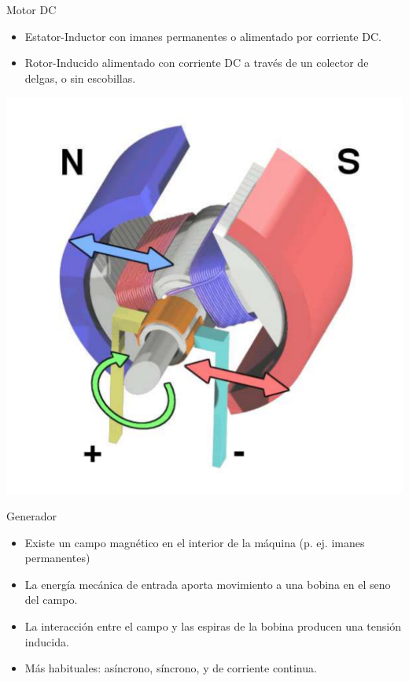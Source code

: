 \documentclass[xcolor={usenames,svgnames,dvipsnames}]{beamer}
\begin{document}
\begin{frame}[label={sec:org9376822}]{Motor DC}
\begin{itemize}
\item Estator-Inductor con imanes permanentes o alimentado por corriente DC.

\item Rotor-Inducido alimentado con corriente DC a través de un colector de delgas, o sin escobillas.
\end{itemize}

\begin{center}
\includegraphics[height=0.6\textheight]{../figs/Electric_motor_cycle_3.pdf}
\end{center}
\end{frame}


\begin{frame}[label={sec:org0b4752c}]{Generador}
\begin{itemize}
\item Existe un campo magnético en el interior de la máquina (p. ej. imanes permanentes)
\item La energía mecánica de entrada aporta movimiento a una bobina en el seno del campo.
\item La interacción entre el campo y las espiras de la bobina producen una tensión inducida.
\item Más habituales: asíncrono, síncrono, y de corriente continua.
\end{itemize}
\end{frame}
\end{document}
